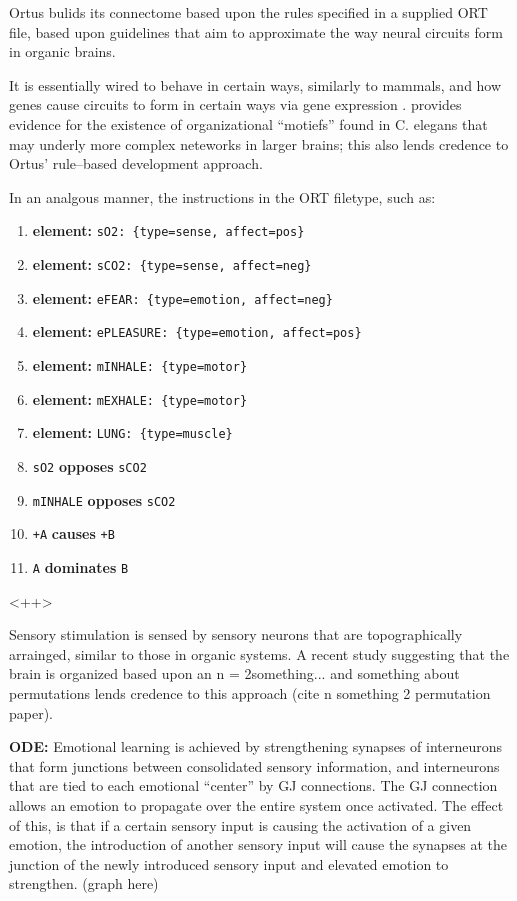 \documentclass[letterpaper]{article}
\begin{document}
Ortus bulids its connectome based upon the rules specified in a supplied ORT file, based upon guidelines that aim to approximate the way neural circuits form in organic brains.

It is essentially wired to behave in certain ways, similarly to mammals, and how genes cause circuits to form in certain ways via gene expression \citep{MNCF:wiredforbehaviors}. 
\citet{Schroter2017} provides evidence for the existence of organizational ``motiefs'' found in C. elegans that may underly more complex neteworks in larger brains; this also lends credence to Ortus' rule--based development approach.

In an analgous manner, the instructions in the ORT filetype, such as:

\begin{enumerate}
    \item \textbf{element:} \texttt{sO2: \{type=sense, affect=pos\}}
    \item \textbf{element:} \texttt{sCO2: \{type=sense, affect=neg\}}
    \item \textbf{element:} \texttt{eFEAR: \{type=emotion, affect=neg\}}
    \item \textbf{element:} \texttt{ePLEASURE: \{type=emotion, affect=pos\}}
    \item \textbf{element:} \texttt{mINHALE: \{type=motor\}}
    \item \textbf{element:} \texttt{mEXHALE: \{type=motor\}}
    \item \textbf{element:} \texttt{LUNG: \{type=muscle\}}
    \item \texttt{sO2} \textbf{opposes} \texttt{sCO2}
    \item \texttt{mINHALE} \textbf{opposes} \texttt{sCO2}
    \item \texttt{+A} \textbf{causes} \texttt{+B}
    \item \texttt{A} \textbf{dominates} \texttt{B}
\end{enumerate}<++>



Sensory stimulation is sensed by sensory neurons that are topographically arrainged, similar to those in organic systems. A recent study suggesting that the brain is organized based upon an n = 2something... and something about permutations lends credence to this approach (cite n something 2 permutation paper).


\textbf{ODE:} Emotional learning is achieved by strengthening synapses of interneurons that form junctions between consolidated sensory information, and interneurons that are tied to each emotional ``center'' by GJ connections. The GJ connection allows an emotion to propagate over the entire system once activated. The effect of this, is that if a certain sensory input is causing the activation of a given emotion, the introduction of another sensory input will cause the synapses at the junction of the newly introduced sensory input and elevated emotion to strengthen. (graph here)
\end{document}
